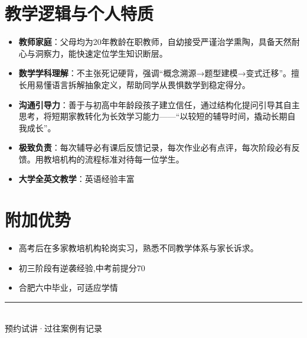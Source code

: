 \documentclass[11pt,a4paper]{ctexart}
\begin{document}
\section{\faBrain \quad 教学逻辑与个人特质}
\begin{itemize}
    \item \textbf{教师家庭}：父母均为20年教龄在职教师，自幼接受严谨治学熏陶，具备天然耐心与洞察力，能快速定位学生知识断层。
    \item \textbf{数学学科理解}：不主张死记硬背，强调“概念溯源→题型建模→变式迁移”。擅长用易懂语言拆解抽象定义，帮助同学从畏惧数学到稳定得分。
    \item \textbf{沟通引导力}：善于与初高中年龄段孩子建立信任，通过结构化提问引导其自主思考，将短期家教转化为长效学习能力——“以较短的辅导时间，撬动长期自我成长”。
    \item \textbf{极致负责}：每次辅导必有课后反馈记录，每次作业必有点评，每次阶段必有反馈。用教培机构的流程标准对待每一位学生。
    \item \textbf{大学全英文教学}：英语经验丰富
\end{itemize}

\section{\faStar \quad 附加优势}
\begin{itemize}
    \item 高考后在多家教培机构轮岗实习，熟悉不同教学体系与家长诉求。
    \item 初三阶段有逆袭经验,中考前提分70
    \item 合肥六中毕业，可适应学情
\end{itemize}

\vspace{6pt}
\begin{center}
    \textcolor{mainblue!70}{\rule{0.7\textwidth}{0.6pt}}\\[4pt]
    \textcolor{darktext}{\small 预约试讲·过往案例有记录}
\end{center}
\end{document}
